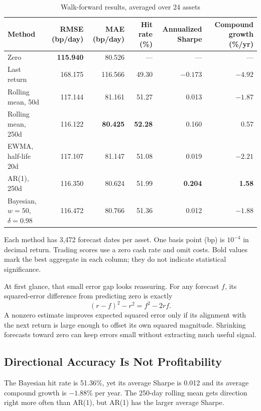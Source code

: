 \documentclass[conference]{IEEEtran}
\begin{document}
\begin{table}[t]
\caption{Walk-forward results, averaged over 24 assets}
\label{tab:main}
\centering\small
\begin{tabular}{lrrrrr}
\toprule
Method & RMSE (bp/day) & MAE (bp/day) & Hit rate (\%) & Annualized Sharpe & Compound growth (\%/yr)\\
\midrule
Zero & \textbf{115.940} & 80.526 & --- & --- & ---\\
Last return & 168.175 & 116.566 & 49.30 & $-0.173$ & $-4.92$\\
Rolling mean, 50d & 117.144 & 81.161 & 51.27 & 0.013 & $-1.87$\\
Rolling mean, 250d & 116.122 & \textbf{80.425} & \textbf{52.28} & 0.160 & 0.57\\
EWMA, half-life 20d & 117.107 & 81.147 & 51.08 & 0.019 & $-2.21$\\
AR(1), 250d & 116.350 & 80.624 & 51.99 & \textbf{0.204} & \textbf{1.58}\\
Bayesian, $w=50$, $\delta=0.98$ & 116.472 & 80.766 & 51.36 & 0.012 & $-1.88$\\
\bottomrule
\end{tabular}
\vspace{3pt}

\parbox{0.96\textwidth}{\footnotesize Each method has 3,472 forecast dates per asset. One basis point (bp) is $10^{-4}$ in decimal return. Trading scores use a zero cash rate and omit costs. Bold values mark the best aggregate in each column; they do not indicate statistical significance.}
\end{table}

At first glance, that small error gap looks reassuring. For any forecast $f$, its squared-error difference from predicting zero is exactly
\begin{equation}
 (r-f)^2-r^2=f^2-2rf.
 \label{eq:loss}
\end{equation}
A nonzero estimate improves expected squared error only if its alignment with the next return is large enough to offset its own squared magnitude. Shrinking forecasts toward zero can keep errors small without extracting much useful signal.

\subsection{Directional Accuracy Is Not Profitability}
The Bayesian hit rate is 51.36\%, yet its average Sharpe is 0.012 and its average compound growth is $-1.88$\% per year. The 250-day rolling mean gets direction right more often than AR(1), but AR(1) has the larger average Sharpe.
\end{document}
